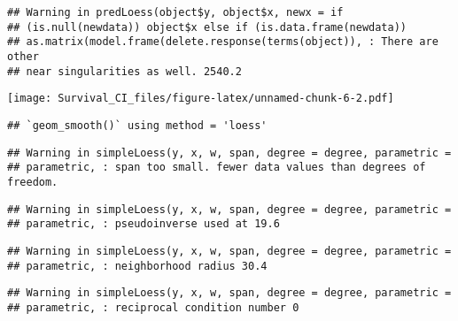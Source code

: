 \documentclass[]{article}
\newenvironment{Shaded}{\begin{snugshade}}{\end{snugshade}}
\newcommand{\KeywordTok}[1]{\textcolor[rgb]{0.13,0.29,0.53}{\textbf{{#1}}}}
\newcommand{\DataTypeTok}[1]{\textcolor[rgb]{0.13,0.29,0.53}{{#1}}}
\newcommand{\StringTok}[1]{\textcolor[rgb]{0.31,0.60,0.02}{{#1}}}
\newcommand{\CommentTok}[1]{\textcolor[rgb]{0.56,0.35,0.01}{\textit{{#1}}}}
\newcommand{\NormalTok}[1]{{#1}}
\begin{document}
\begin{verbatim}
## Warning in predLoess(object$y, object$x, newx = if
## (is.null(newdata)) object$x else if (is.data.frame(newdata))
## as.matrix(model.frame(delete.response(terms(object)), : There are other
## near singularities as well. 2540.2
\end{verbatim}

\texttt{[image: Survival\_CI\_files/figure-latex/unnamed-chunk-6-2.pdf]}

\begin{Shaded}
\end{Shaded}

\begin{verbatim}
## `geom_smooth()` using method = 'loess'
\end{verbatim}

\begin{verbatim}
## Warning in simpleLoess(y, x, w, span, degree = degree, parametric =
## parametric, : span too small. fewer data values than degrees of freedom.
\end{verbatim}

\begin{verbatim}
## Warning in simpleLoess(y, x, w, span, degree = degree, parametric =
## parametric, : pseudoinverse used at 19.6
\end{verbatim}

\begin{verbatim}
## Warning in simpleLoess(y, x, w, span, degree = degree, parametric =
## parametric, : neighborhood radius 30.4
\end{verbatim}

\begin{verbatim}
## Warning in simpleLoess(y, x, w, span, degree = degree, parametric =
## parametric, : reciprocal condition number 0
\end{verbatim}
\end{document}
